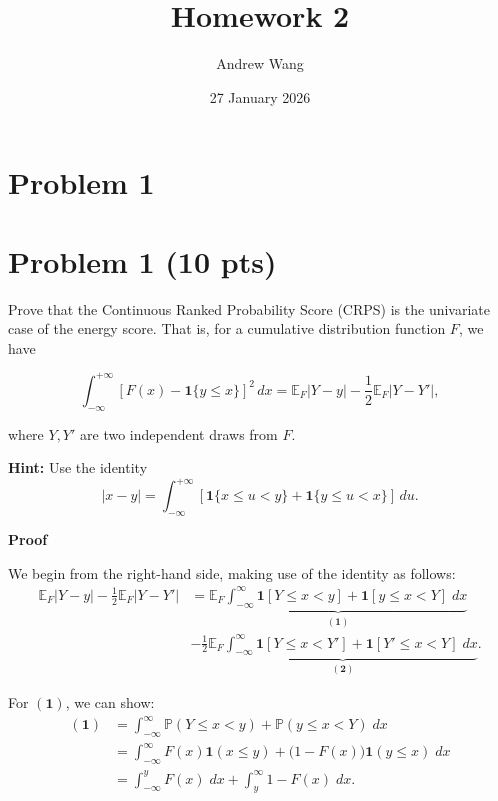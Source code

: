 \documentclass[11pt]{article}
\title{Homework 2}
\author{Andrew Wang}
\date{27 January 2026}
\begin{document}
\maketitle

\section{Problem 1}

\section*{Problem 1 (10 pts)}

Prove that the Continuous Ranked Probability Score (CRPS) is the univariate case of the energy score. That is, for a cumulative distribution function $F$, we have

\[
\int_{-\infty}^{+\infty} \left[ F(x) - \mathbf{1}\{ y \le x \} \right]^2 \, dx
=
\mathbb{E}_F \left| Y - y \right|
-
\frac{1}{2} \mathbb{E}_F \left| Y - Y' \right|,
\]

where $Y, Y'$ are two independent draws from $F$.

\medskip

\noindent\textbf{Hint:} Use the identity
\[
|x - y|
=
\int_{-\infty}^{+\infty}
\left[
\mathbf{1}\{ x \le u < y \}
+
\mathbf{1}\{ y \le u < x \}
\right]
\, du.
\]

\hrulefill

\textbf{Proof}

We begin from the right-hand side, making use of the identity as follows:
\begin{align}
    \mathbb{E}_F \left| Y - y \right|
    -
    \frac{1}{2} \mathbb{E}_F \left| Y - Y' \right| &=
    \underbrace{\mathbb{E}_F \int_{-\infty}^{\infty}\mathbf{1}[Y \leq x < y] + \mathbf{1}[y \leq x < Y] \; dx}_{\mathbf{(1)}} \nonumber \\
    &-
    \frac{1}{2} \underbrace{\mathbb{E}_F \int_{-\infty}^{\infty}\mathbf{1}[Y \leq x < Y'] + \mathbf{1}[Y' \leq x < Y] \; dx}_{\mathbf{(2)}}. \label{p1}
\end{align}

For $\mathbf{(1)}$, we can show:
\begin{align}
    \mathbf{(1)} &= \int_{-\infty}^{\infty} \mathbb{P}(Y \leq x < y) + \mathbb{P}(y \leq x < Y) \; dx \nonumber \\
    &= \int_{-\infty}^{\infty} F(x) \mathbf{1}(x \leq y) + \big( 1 - F(x) \big) \mathbf{1}(y \leq x) \; dx \nonumber \\
    &= \int_{-\infty}^{y} F(x) \; dx + \int_{y}^{\infty} 1 - F(x) \; dx. \label{p1.1}
\end{align}
\end{document}
